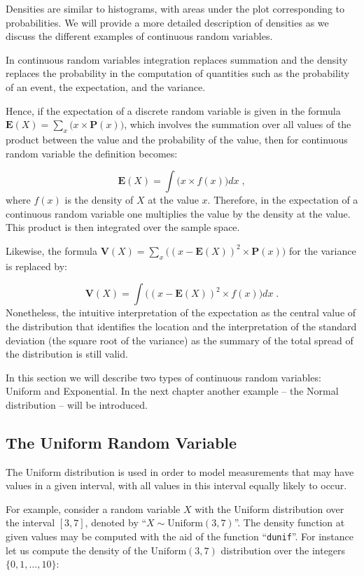 \documentclass[
]{krantz}
\newcommand{\Expec}{\mathbf{E}}
\newcommand{\Prob}{\mathbf{P}}
\newcommand{\Var}{\mathbf{V}}
\theoremstyle{definition}
\theoremstyle{definition}
\theoremstyle{definition}
\theoremstyle{remark}
\begin{document}
Densities are similar to histograms, with areas under the plot
corresponding to probabilities. We will provide a more detailed
description of densities as we discuss the different examples of
continuous random variables.

In continuous random variables integration replaces summation and the
density replaces the probability in the computation of quantities such
as the probability of an event, the expectation, and the variance.

Hence, if the expectation of a discrete random variable is given in the
formula \(\Expec(X) = \sum_x \big(x \times \Prob(x)\big)\), which involves
the summation over all values of the product between the value and the
probability of the value, then for continuous random variable the
definition becomes:

\[\Expec(X) = \int \big(x \times f(x)\big)dx\;,\]
where \(f(x)\) is the density of \(X\) at the value \(x\). Therefore, in the
expectation of a continuous random variable one multiplies the value by
the density at the value. This product is then integrated over the
sample space.

Likewise, the formula
\(\Var(X) = \sum_x\big( (x-\Expec(X))^2 \times \Prob(x)\big)\) for the
variance is replaced by:

\[\Var(X) =\int\big((x-\Expec(X))^2 \times f(x) \big) dx\;.\]
Nonetheless, the intuitive interpretation of the expectation as the
central value of the distribution that identifies the location and the
interpretation of the standard deviation (the square root of the
variance) as the summary of the total spread of the distribution is
still valid.

In this section we will describe two types of continuous random
variables: Uniform and Exponential. In the next chapter another example
-- the Normal distribution -- will be introduced.

\hypertarget{the-uniform-random-variable}{%
\subsection{The Uniform Random Variable}\label{the-uniform-random-variable}}

The Uniform distribution is used in order to model measurements that may
have values in a given interval, with all values in this interval
equally likely to occur.

For example, consider a random variable \(X\) with the Uniform
distribution over the interval \([3,7]\), denoted by
``\(X \sim \mathrm{Uniform}(3,7)\)''. The density function at given values
may be computed with the aid of the function ``\texttt{dunif}''. For instance let
us compute the density of the \(\mathrm{Uniform}(3,7)\) distribution over
the integers \(\{0, 1, \ldots, 10\}\):
\end{document}
